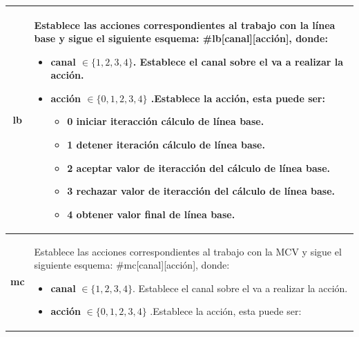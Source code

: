 \begin{table}[ht]
\begin{tabular}{ |c|p{14cm}|}
        \textbf{lb}     &   \begin{minipage}{14cm}
                                \vspace{1pt}
                                Establece las acciones correspondientes al trabajo con la línea base y sigue el siguiente esquema: \#lb[canal][acción], donde:
                                \begin{itemize}
                                    \item \textbf{canal} $\in \{1, 2, 3, 4\}$. Establece el canal sobre el va a realizar la acción.
                                    \item \textbf{acción} $\in \{0, 1, 2, 3, 4\}$ .Establece la acción, esta puede ser: 
                                    \begin{itemize}
                                        \item 0 iniciar iteracción cálculo de línea base.
                                        \item 1 detener iteración cálculo de línea base.
                                        \item 2 aceptar valor de iteracción del cálculo de línea base.
                                        \item 3 rechazar valor de iteracción del cálculo de línea base.
                                        \item 4 obtener valor final de línea base.
                                    \end{itemize}
                                \end{itemize} 
                                \vspace{1pt}
                            \end{minipage}\\\hline
        \textbf{mc}     &   \begin{minipage}{14cm}
                                \vspace{1pt}
                                Establece las acciones correspondientes al trabajo con la MCV y sigue el siguiente esquema: \#mc[canal][acción], donde:
                                \begin{itemize}
                                    \item \textbf{canal} $\in \{1, 2, 3, 4\}$. Establece el canal sobre el va a realizar la acción.
                                    \item \textbf{acción} $\in \{0, 1, 2, 3, 4\}$ .Establece la acción, esta puede ser: 

\end{itemize}
\end{minipage}
\end{tabular}
\end{table}
